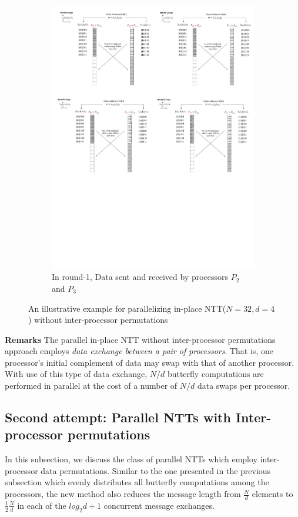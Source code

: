 \documentclass{iacrtrans}
\theoremstyle{plain}
\begin{document}
\begin{figure}[!tb]
\begin{subfigure}[b]{.47\textwidth}
\includegraphics[width=\textwidth]{./fig/DataSwapWithoutPerm4.pdf}
\caption{In round-1, Data sent and received by processors $P_2$ and $P_3$}\label{fig:dataswap_without_perm4}
\end{subfigure}

\caption{An illustrative example for parallelizing in-place NTT($N=32,d=4$) without inter-processor permutations}\label{fig:dataswap_without_perm}
\end{figure}

\textbf{Remarks} The parallel in-place NTT without inter-processor permutations approach employs \textit{data exchange between a pair of processors}. That is, one processor's initial complement of data may swap with that of another processor. With use of this type of data exchange, $N/d$ butterfly computations are performed in parallel at the cost of a number of $N/d$ data swaps per processor.  


\subsection{Second attempt: Parallel NTTs with Inter-processor permutations}
In this subsection, we discuss the class of parallel NTTs which employ inter-processor data permutations. Similar to the one presented in the previous subsection which evenly distributes all butterfly computations among the processors, the new method also reduces the message length from $\frac{N}{d}$ elements to $\frac{1}{2}\frac{N}{d}$ in each of the $log_2d+1$ concurrent message exchanges.
\end{document}
